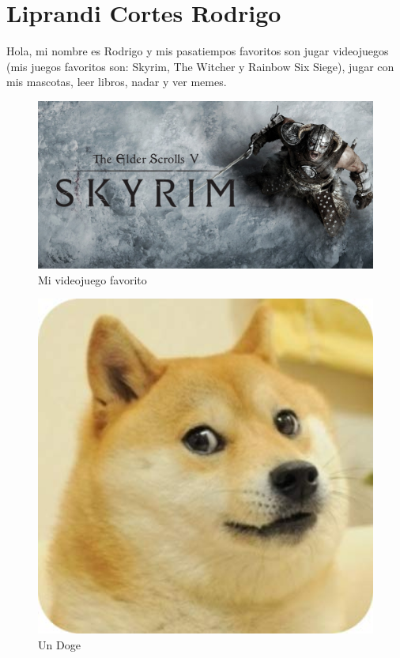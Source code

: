 \chapter{Liprandi Cortes Rodrigo}

Hola, mi nombre es Rodrigo y mis pasatiempos favoritos son jugar videojuegos (mis juegos favoritos son: Skyrim, The Witcher y Rainbow Six Siege), jugar con mis mascotas, leer libros, nadar y ver memes.

\begin{figure}[H] %
  \begin{center}
    \includegraphics[width=450pt]{317275605/syrim.jpg}
    \caption{Mi videojuego favorito} 
  \end{center}
\end{figure}

\begin{figure}[H] %
  \begin{center}
    \includegraphics[width=450pt]{317275605/doge.jpg}
    \caption{Un Doge}
  \end{center}
\end{figure}

